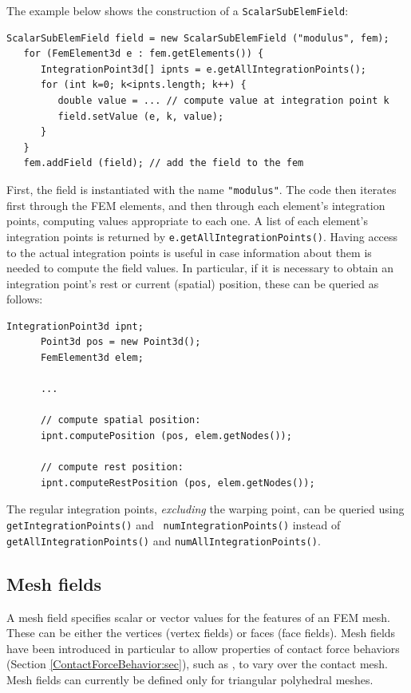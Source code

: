 The example below shows the construction of a {\tt ScalarSubElemField}:
%
\begin{lstlisting}[]
   ScalarSubElemField field = new ScalarSubElemField ("modulus", fem);
   for (FemElement3d e : fem.getElements()) {
      IntegrationPoint3d[] ipnts = e.getAllIntegrationPoints();
      for (int k=0; k<ipnts.length; k++) {
         double value = ... // compute value at integration point k
         field.setValue (e, k, value);
      }
   }
   fem.addField (field); // add the field to the fem
\end{lstlisting}
%
First, the field is instantiated with the name {\tt "modulus"}.  The
code then iterates first through the FEM elements, and then through
each element's integration points, computing values appropriate to
each one. A list of each element's integration points is returned by
{\tt e.getAllIntegrationPoints()}. Having access to the actual
integration points is useful in case information about them is needed
to compute the field values. In particular, if it is necessary to
obtain an integration point's rest or current (spatial) position,
these can be queried as follows:
%
\begin{lstlisting}[]
      IntegrationPoint3d ipnt;
      Point3d pos = new Point3d();
      FemElement3d elem;

      ...

      // compute spatial position:
      ipnt.computePosition (pos, elem.getNodes());

      // compute rest position:
      ipnt.computeRestPosition (pos, elem.getNodes());
\end{lstlisting}
%

\begin{sideblock}
The regular integration points, {\it excluding} the warping point, can
be queried using {\tt getIntegrationPoints()} and {\tt
numIntegrationPoints()} instead of {\tt getAllIntegrationPoints()}
and {\tt numAllIntegrationPoints()}.
\end{sideblock}

\subsection{Mesh fields}
\label{sec:meshFields}

A mesh field specifies scalar or vector values for the features of an
FEM mesh. These can be either the vertices (vertex fields) or faces
(face fields). Mesh fields have been introduced in particular to allow
properties of contact force behaviors
(Section \ref{ContactForceBehavior:sec}), such as 
,
to vary over the contact mesh. Mesh fields can currently be defined
only for triangular polyhedral meshes.

